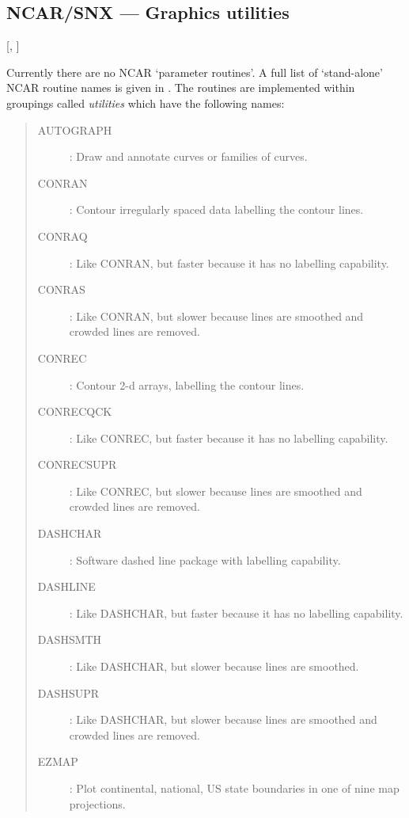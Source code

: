 \subsection{NCAR/SNX --- Graphics utilities}

\vspace{-9mm}

\hfill [, ]

\vspace{2mm}

Currently there are no NCAR `parameter routines'.
A full list of `stand-alone' NCAR routine names is given in
.
The routines are implemented within groupings called {\em utilities} which
have the following names:

\begin{quote}
\begin{description}
\item [AUTOGRAPH] :
 Draw and annotate curves or families of curves.
\\
\item [CONRAN] :
 Contour irregularly spaced data labelling the contour lines.
\item [CONRAQ] :
 Like CONRAN, but faster because it has no labelling capability.
\item [CONRAS] :
 Like CONRAN, but slower because lines are smoothed and crowded lines are
 removed.
\\
\item [CONREC] :
 Contour 2-d arrays, labelling the contour lines.
\item [CONRECQCK] :
 Like CONREC, but faster because it has no labelling capability.
\item [CONRECSUPR] :
 Like CONREC, but slower because lines are smoothed and crowded lines are
 removed.
\\
\item [DASHCHAR] :
 Software dashed line package with labelling capability.
\item [DASHLINE] :
 Like DASHCHAR, but faster because it has no labelling capability.
\item [DASHSMTH] :
 Like DASHCHAR, but slower because lines are smoothed.
\item [DASHSUPR] :
 Like DASHCHAR, but slower because lines are smoothed and crowded lines are
 removed.
\\
\item [EZMAP] :
 Plot continental, national, US state boundaries in one of nine map
 projections.

\end{description}
\end{quote}
